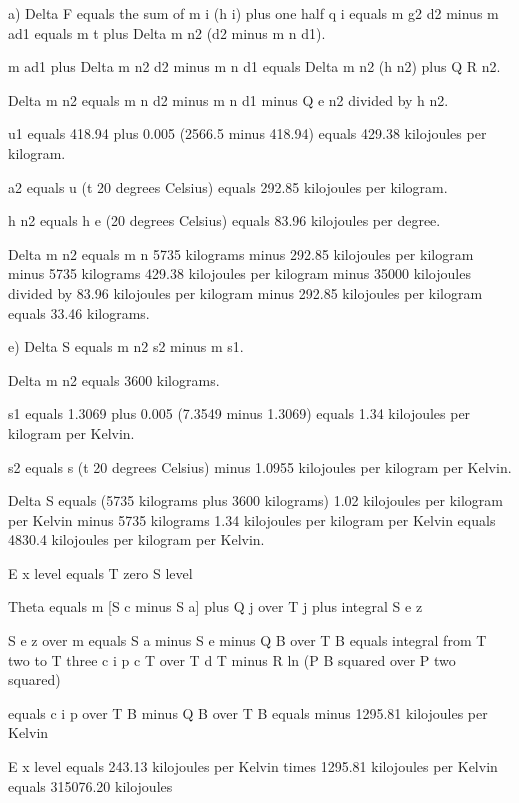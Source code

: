 a) Delta F equals the sum of m i (h i) plus one half q i equals m g2 d2 minus m ad1 equals m t plus Delta m n2 (d2 minus m n d1).

m ad1 plus Delta m n2 d2 minus m n d1 equals Delta m n2 (h n2) plus Q R n2.

Delta m n2 equals m n d2 minus m n d1 minus Q e n2 divided by h n2.

u1 equals 418.94 plus 0.005 (2566.5 minus 418.94) equals 429.38 kilojoules per kilogram.

a2 equals u (t 20 degrees Celsius) equals 292.85 kilojoules per kilogram.

h n2 equals h e (20 degrees Celsius) equals 83.96 kilojoules per degree.

Delta m n2 equals m n 5735 kilograms minus 292.85 kilojoules per kilogram minus 5735 kilograms 429.38 kilojoules per kilogram minus 35000 kilojoules divided by 83.96 kilojoules per kilogram minus 292.85 kilojoules per kilogram equals 33.46 kilograms.

e) Delta S equals m n2 s2 minus m s1.

Delta m n2 equals 3600 kilograms.

s1 equals 1.3069 plus 0.005 (7.3549 minus 1.3069) equals 1.34 kilojoules per kilogram per Kelvin.

s2 equals s (t 20 degrees Celsius) minus 1.0955 kilojoules per kilogram per Kelvin.

Delta S equals (5735 kilograms plus 3600 kilograms) 1.02 kilojoules per kilogram per Kelvin minus 5735 kilograms 1.34 kilojoules per kilogram per Kelvin equals 4830.4 kilojoules per kilogram per Kelvin.

E x level equals T zero S level

Theta equals m [S c minus S a] plus Q j over T j plus integral S e z

S e z over m equals S a minus S e minus Q B over T B equals integral from T two to T three c i p c T over T d T minus R ln (P B squared over P two squared)

equals c i p over T B minus Q B over T B equals minus 1295.81 kilojoules per Kelvin

E x level equals 243.13 kilojoules per Kelvin times 1295.81 kilojoules per Kelvin equals 315076.20 kilojoules